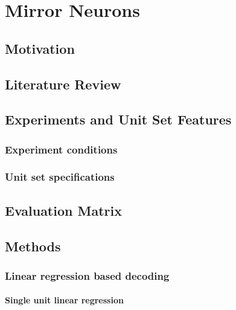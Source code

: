 \documentclass[a4,12pt]{ozu-thesis}
\begin{document}
\chapter{Mirror Neurons}

\section{Motivation}

\section{Literature Review}

\section{Experiments and Unit Set Features}



\subsection{Experiment conditions}


\subsection{Unit set specifications}


\section{Evaluation Matrix}


\section{Methods}
\subsection{Linear regression based decoding}


\subsubsection{Single unit linear regression}

\end{document}
